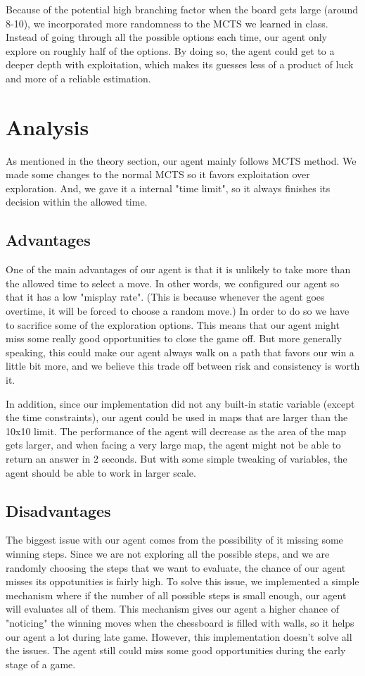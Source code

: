 \documentclass[twoside,11pt]{article}
\begin{document}
Because of the potential high branching factor when the board gets large (around 8-10), we incorporated more randomness to the MCTS we learned in class. 
Instead of going through all the possible options each time, our agent only explore on roughly half of the options. 
By doing so, the agent could get to a deeper depth with exploitation, which makes its guesses less of a product of luck and more of a reliable estimation.

\section{Analysis}
As mentioned in the theory section, our agent mainly follows MCTS method. 
We made some changes to the normal MCTS so it favors exploitation over exploration. 
And, we gave it a internal "time limit", so it always finishes its decision within the allowed time.

\subsection{Advantages}
One of the main advantages of our agent is that it is unlikely to take more than the allowed time to select a move. 
In other words, we configured our agent so that it has a low "misplay rate".
(This is because whenever the agent goes overtime, it will be forced to choose a random move.)
In order to do so we have to sacrifice some of the exploration options. 
This means that our agent might miss some really good opportunities to close the game off. 
But more generally speaking, this could make our agent always walk on a path that favors our win a little bit more, and we believe this trade off between risk and consistency is worth it.

In addition, since our implementation did not any built-in static variable (except the time constraints), our agent could be used in maps that are larger than the 10x10 limit. 
The performance of the agent will decrease as the area of the map gets larger, and when facing a very large map, the agent might not be able to return an answer in 2 seconds.
But with some simple tweaking of variables, the agent should be able to work in larger scale.

\subsection{Disadvantages}
The biggest issue with our agent comes from the possibility of it missing some winning steps.
Since we are not exploring all the possible steps, and we are randomly choosing the steps that we want to evaluate, the chance of our agent misses its oppotunities is fairly high.
To solve this issue, we implemented a simple mechanism where if the number of all possible steps is small enough, our agent will evaluates all of them.
This mechanism gives our agent a higher chance of "noticing" the winning moves when the chessboard is filled with walls, so it helps our agent a lot during late game. 
However, this implementation doesn't solve all the issues. 
The agent still could miss some good opportunities during the early stage of a game.
\end{document}
